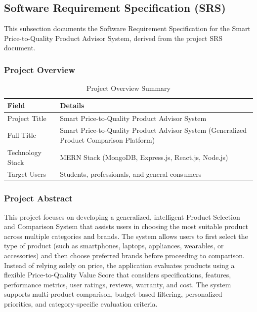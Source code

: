 \subsection{Software Requirement Specification (SRS)}

This subsection documents the Software Requirement Specification for the Smart Price-to-Quality Product Advisor System, derived from the project SRS document.

\subsubsection{Project Overview}

\begin{table}[H]
\centering
\renewcommand{\arraystretch}{1.3}
\begin{tabular}{|p{4cm}|p{9cm}|}
    \hline
    \textbf{Field} & \textbf{Details} \\
    \hline
    Project Title & Smart Price-to-Quality Product Advisor System \\
    \hline
    Full Title & Smart Price-to-Quality Product Advisor System (Generalized Product Comparison Platform) \\
    \hline
    Technology Stack & MERN Stack (MongoDB, Express.js, React.js, Node.js) \\
    \hline
    Target Users & Students, professionals, and general consumers \\
    \hline
\end{tabular}
\caption{Project Overview Summary}
\label{tab:srs_overview}
\end{table}

\subsubsection{Project Abstract}

This project focuses on developing a generalized, intelligent Product Selection and Comparison System that assists users in choosing the most suitable product across multiple categories and brands. The system allows users to first select the type of product (such as smartphones, laptops, appliances, wearables, or accessories) and then choose preferred brands before proceeding to comparison. Instead of relying solely on price, the application evaluates products using a flexible Price-to-Quality Value Score that considers specifications, features, performance metrics, user ratings, reviews, warranty, and cost. The system supports multi-product comparison, budget-based filtering, personalized priorities, and category-specific evaluation criteria.

